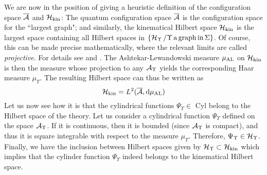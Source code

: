 \documentclass[aps,prd,tightenlines,showpacs,nofootinbib,preprint]{revtex4}
\def\d{{\rm d}}
\begin{document}
We are now in the position of giving a heuristic definition of the
configuration space $\overline{\cal A}$ and ${\cal H}_{\rm kin}$:
The quantum configuration space $\overline{\cal A}$ is the
configuration space for the ``largest graph"; and similarly, the
kinematical Hilbert space ${\cal H}_{\rm kin}$ is the largest
space containing all Hilbert spaces in $\{ {\cal H}_\Upsilon \,/
\Upsilon \,{\rm a\,graph\,in\,} \Sigma\}$. Of course, this can be
made precise mathematically, where the relevant limits are called
{\it projective}. For details see \cite{alm2t,AL:review} and
\cite{Thiemann:2001yy}. The Ashtekar-Lewandowski  measure
$\mu_{\rm AL}$ on ${\cal H}_{\rm kin}$ is then the measure whose
projection to any ${\cal A}_\Upsilon$ yields the corresponding
Haar measure $\mu_\Upsilon$. The resulting Hilbert space can thus
be written as
$$
{\cal H}_{\rm kin}=L^2(\overline{\cal A},\d\mu_{\rm AL})
$$
Let us now see how it is that the cylindrical functions
$\Psi_\Upsilon\in$ Cyl belong to the Hilbert space of the theory.
Let us consider a cylindrical function $\Psi_\Upsilon$ defined on
the space ${\cal A}_\Upsilon$. If it is continuous, then it is
bounded (since ${\cal A}_\Upsilon$ is compact), and thus it is
square integrable with respect to the measure $\mu_\Upsilon$.
Therefore, $\Psi_\Upsilon \in {\cal H}_\Upsilon$. Finally, we have
the inclusion between Hilbert spaces given by ${\cal H}_\Upsilon
\subset {\cal H}_{\rm kin}$ which implies that the cylinder
function $\Psi_\Upsilon$ indeed belongs to the kinematical Hilbert
space.
\end{document}
